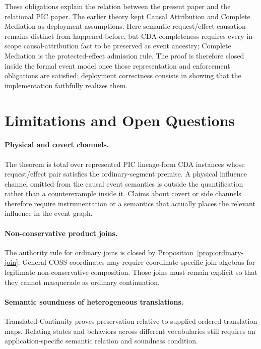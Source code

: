 \documentclass[10pt,twocolumn]{article}
\begin{document}
These obligations explain the relation between the present paper and the
relational PIC paper.  The earlier theory kept Causal Attribution and Complete
Mediation as deployment assumptions.  Here semantic request/effect causation
remains distinct from happened-before, but CDA-completeness requires every
in-scope causal-attribution fact to be preserved as event ancestry; Complete
Mediation is the protected-effect admission rule.  The proof is therefore
closed inside the formal event model once those representation and enforcement
obligations are satisfied; deployment correctness consists in showing that the
implementation faithfully realizes them.



\section{Limitations and Open Questions}

\paragraph{Physical and covert channels.}
The theorem is total over represented PIC lineage-form CDA instances whose
request/effect pair satisfies the ordinary-segment premise.  A physical influence channel omitted from the causal event semantics is
outside the quantification rather than a counterexample inside it.  Claims
about covert or side channels therefore require instrumentation or a semantics
that actually places the relevant influence in the event graph.

\paragraph{Non-conservative product joins.}
The authority rule for ordinary joins is closed by
Proposition~\ref{prop:ordinary-join}.  General COSS coordinates may require
coordinate-specific join algebras for legitimate non-conservative composition.
Those joins must remain explicit so that they cannot masquerade as ordinary
continuation.

\paragraph{Semantic soundness of heterogeneous translations.}
Translated Continuity proves preservation relative to supplied ordered
translation maps.  Relating states and behaviors across different vocabularies
still requires an application-specific semantic relation and soundness
condition.
\end{document}
